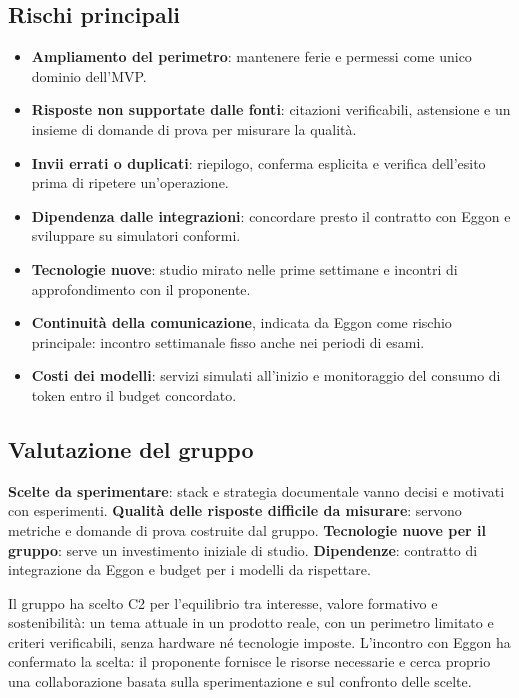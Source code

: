 \subsection{Rischi principali}
\begin{itemize}
  \item \textbf{Ampliamento del perimetro}: mantenere ferie e permessi come
        unico dominio dell'MVP.
  \item \textbf{Risposte non supportate dalle fonti}: citazioni
        verificabili, astensione e un insieme di domande di prova per
        misurare la qualità.
  \item \textbf{Invii errati o duplicati}: riepilogo, conferma esplicita e
        verifica dell'esito prima di ripetere un'operazione.
  \item \textbf{Dipendenza dalle integrazioni}: concordare presto il
        contratto con Eggon e sviluppare su simulatori conformi.
  \item \textbf{Tecnologie nuove}: studio mirato nelle prime settimane e
        incontri di approfondimento con il proponente.
  \item \textbf{Continuità della comunicazione}, indicata da Eggon come
        rischio principale: incontro settimanale fisso anche nei periodi di
        esami.
  \item \textbf{Costi dei modelli}: servizi simulati all'inizio e
        monitoraggio del consumo di token entro il budget concordato.
\end{itemize}

\subsection{Valutazione del gruppo}

\begin{fortedeboli}
     {\textbf{Scelte da sperimentare}: stack e strategia documentale vanno
      decisi e motivati con esperimenti.}
     {\textbf{Qualità delle risposte difficile da misurare}: servono
      metriche e domande di prova costruite dal gruppo.}
     {\textbf{Tecnologie nuove per il gruppo}: serve un investimento
      iniziale di studio.}
     {\textbf{Dipendenze}: contratto di integrazione da Eggon e budget
      per i modelli da rispettare.}
\end{fortedeboli}

Il gruppo ha scelto C2 per l'equilibrio tra interesse, valore formativo e
sostenibilità: un tema attuale in un prodotto reale, con un perimetro
limitato e criteri verificabili, senza hardware né tecnologie imposte.
L'incontro con Eggon ha confermato la scelta: il proponente fornisce le
risorse necessarie e cerca proprio una collaborazione basata sulla
sperimentazione e sul confronto delle scelte.

